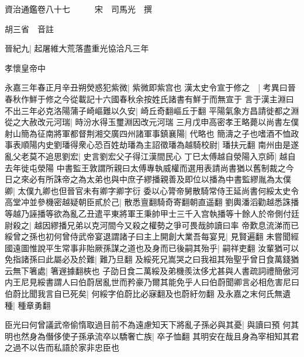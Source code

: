 資治通鑑卷八十七　　　宋　司馬光　撰

胡三省　音註

晉紀九|{
	起屠維大荒落盡重光協洽凡三年}


孝懷皇帝中

永嘉三年春正月辛丑朔熒惑犯紫微|{
	紫微即紫宫也}
漢太史令宣于修之　|{
	考異曰晉春秋作鮮于修之今從載記十六國春秋余按姓氏諸書有鮮于而無宣于}
言于漢主淵曰不出三年必克洛陽蒲子崎嶇難以久安|{
	崎丘奇翻嶇丘于翻}
平陽氣象方昌請徙都之淵從之大赦改元河瑞|{
	時汾水得玉璽淵因改元河瑞}
三月戊申高密孝王略薨以尚書左僕射山簡為征南將軍都督荆湘交廣四州諸軍事鎮襄陽|{
	代略也}
簡濤之子也嗜酒不恤政事表順陽内史劉璠得衆心恐百姓劫璠為主詔徵璠為越騎校尉|{
	璠扶元翻}
南州由是遂亂父老莫不追思劉宏|{
	史言劉宏父子得江漢間民心}
丁巳太傅越自滎陽入京師|{
	越自去年徙屯滎陽}
中書監王敦謂所親曰太傅專執威權而選用表請尚書猶以舊制裁之今日之來必有所誅帝之為太弟也與中庶子繆播親善及即位以播為中書監繆胤為太僕卿|{
	太僕九卿也但晉官未有卿字卿字衍}
委以心膂帝舅散騎常侍王延尚書何綏太史令高堂冲並參機密越疑朝臣貳於己|{
	散悉亶翻騎奇寄翻朝直遥翻}
劉輿潘滔勸越悉誅播等越乃誣播等欲為亂乙丑遣平東將軍王秉帥甲士三千入宫執播等十餘人於帝側付廷尉殺之|{
	越因繆播兄弟以克河間今又殺之權勢之爭可畏哉帥讀曰率}
帝歎息流涕而已綏曾之孫也初何曾侍武帝宴退謂諸子曰主上開創大業吾每宴見|{
	見賢遍翻}
未嘗聞經國遠圖惟說平生常事非貽厥孫謀之道也及身而已後嗣其殆乎|{
	嗣祥吏翻}
汝輩猶可以免指諸孫曰此屬必及於難|{
	難乃旦翻}
及綏死兄嵩哭之曰我祖其殆聖乎曾日食萬錢猶云無下箸處|{
	箸遟據翻梜也}
子劭日食二萬綏及弟機羨汰侈尤甚與人書疏詞禮簡傲河内王尼見綏書謂人曰伯蔚居亂世而矜豪乃爾其能免乎人曰伯蔚聞卿言必相危害尼曰伯蔚比聞我言自已死矣|{
	何綏字伯蔚比必寐翻及也蔚紆勿翻}
及永嘉之末何氏無遺種|{
	種章勇翻}


臣光曰何曾議武帝偷惰取過目前不為遠慮知天下將亂子孫必與其憂|{
	與讀曰預}
何其明也然身為僭侈使子孫承流卒以驕奢亡族|{
	卒子恤翻}
其明安在哉且身為宰相知其君之過不以告而私語於家非忠臣也

